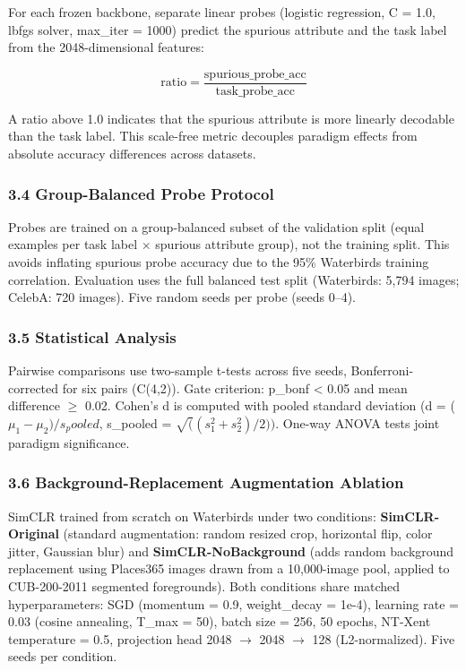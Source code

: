 For each frozen backbone, separate linear probes (logistic regression, C = 1.0, lbfgs solver, max\_iter = 1000) predict the spurious attribute and the task label from the 2048-dimensional features:

$$\text{ratio} = \frac{\text{spurious\_probe\_acc}}{\text{task\_probe\_acc}}$$

A ratio above 1.0 indicates that the spurious attribute is more linearly decodable than the task label. This scale-free metric decouples paradigm effects from absolute accuracy differences across datasets.

\subsubsection{3.4 Group-Balanced Probe Protocol}

Probes are trained on a group-balanced subset of the validation split (equal examples per task label $\times$ spurious attribute group), not the training split. This avoids inflating spurious probe accuracy due to the 95\% Waterbirds training correlation. Evaluation uses the full balanced test split (Waterbirds: 5,794 images; CelebA: 720 images). Five random seeds per probe (seeds 0--4).

\subsubsection{3.5 Statistical Analysis}

Pairwise comparisons use two-sample t-tests across five seeds, Bonferroni-corrected for six pairs (C(4,2)). Gate criterion: p\_bonf < 0.05 and mean difference $\geq$ 0.02. Cohen's d is computed with pooled standard deviation (d = ($\mu _1 - \mu _{2})/s_pooled$, s\_pooled = $\sqrt((s_{1}^2 + s_{2}^{2})/2))$. One-way ANOVA tests joint paradigm significance.

\subsubsection{3.6 Background-Replacement Augmentation Ablation}

SimCLR trained from scratch on Waterbirds under two conditions: \textbf{SimCLR-Original} (standard augmentation: random resized crop, horizontal flip, color jitter, Gaussian blur) and \textbf{SimCLR-NoBackground} (adds random background replacement using Places365 images drawn from a 10,000-image pool, applied to CUB-200-2011 segmented foregrounds). Both conditions share matched hyperparameters: SGD (momentum = 0.9, weight\_decay = 1e-4), learning rate = 0.03 (cosine annealing, T\_max = 50), batch size = 256, 50 epochs, NT-Xent temperature = 0.5, projection head 2048 $\rightarrow$ 2048 $\rightarrow$ 128 (L2-normalized). Five seeds per condition.

